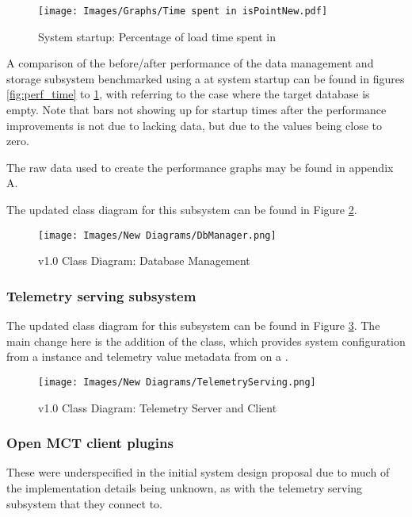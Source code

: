 \begin{figure}[ht]
  \centering
  \texttt{[image: Images/Graphs/Time spent in isPointNew.pdf]}
  \caption{System startup: Percentage of load time spent in }
  \label{fig:perf_percentage}
\end{figure}

A comparison of the before/after performance of the data management and storage subsystem benchmarked using a  at system startup can be found in figures \ref{fig:perf_time} to \ref{fig:perf_percentage}, with  referring to the case where the target database is empty. Note that bars not showing up for startup times after the performance improvements is not due to lacking data, but due to the values being close to zero.

The raw data used to create the performance graphs may be found in appendix A.

The updated class diagram for this subsystem can be found in Figure \ref{fig:new_cddb}.

\begin{figure}[H]
  \centering
  \texttt{[image: Images/New Diagrams/DbManager.png]}
  \caption{v1.0 Class Diagram: Database Management}
  \label{fig:new_cddb}
\end{figure}

\subsubsection{Telemetry serving subsystem}
The updated class diagram for this subsystem can be found in Figure \ref{fig:new_cdserving}. The main change here is the addition of the  class, which provides system configuration from a  instance and telemetry value metadata from  on a .

\begin{figure}[H]
  \centering
  \texttt{[image: Images/New Diagrams/TelemetryServing.png]}
  \caption{v1.0 Class Diagram: Telemetry Server and Client}
  \label{fig:new_cdserving}
\end{figure}

\subsubsection{Open MCT client plugins}
These were underspecified in the initial system design proposal due to much of the implementation details being unknown, as with the telemetry serving subsystem that they connect to.

